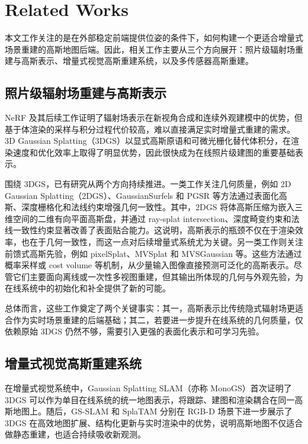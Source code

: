 
\section{Related Works}

本文工作关注的是在外部稳定前端提供位姿的条件下，如何构建一个更适合增量式场景重建的高斯地图后端。因此，相关工作主要从三个方向展开：照片级辐射场重建与高斯表示、增量式视觉高斯重建系统，以及多传感器高斯重建。

\subsection{照片级辐射场重建与高斯表示}

NeRF 及其后续工作证明了辐射场表示在新视角合成和连续外观建模中的优势，但基于体渲染的采样与积分过程代价较高，难以直接满足实时增量式重建的需求。3D Gaussian Splatting（3DGS）以显式高斯原语和可微光栅化替代体积分，在渲染速度和优化效率上取得了明显优势，因此很快成为在线照片级建图的重要基础表示。

围绕 3DGS，已有研究从两个方向持续推进。一类工作关注几何质量，例如 2D Gaussian Splatting（2DGS）、GaussianSurfels 和 PGSR 等方法通过表面化高斯、深度栅格化和法线约束增强几何一致性。其中，2DGS 将体高斯压缩为嵌入三维空间的二维有向平面高斯盘，并通过 ray-splat intersection、深度畸变约束和法线一致性约束显著改善了表面贴合能力。这说明，高斯表示的瓶颈不仅在于渲染效率，也在于几何一致性，而这一点对后续增量式系统尤为关键。另一类工作则关注前馈式高斯先验，例如 pixelSplat、MVSplat 和 MVSGaussian 等。这些方法通过概率采样或 cost volume 等机制，从少量输入图像直接预测可泛化的高斯表示。尽管它们主要面向离线或一次性多视图重建，但其输出所体现的几何与外观先验，为在线系统中的初始化和补全提供了新的可能。

总体而言，这些工作奠定了两个关键事实：其一，高斯表示比传统隐式辐射场更适合作为实时场景重建的后端基础；其二，若要进一步提升在线系统的几何质量，仅依赖原始 3DGS 仍然不够，需要引入更强的表面化表示和可学习先验。

\subsection{增量式视觉高斯重建系统}

在增量式视觉系统中，Gaussian Splatting SLAM（亦称 MonoGS）首次证明了 3DGS 可以作为单目在线系统的统一地图表示，将跟踪、建图和渲染耦合在同一高斯地图上。随后，GS-SLAM 和 SplaTAM 分别在 RGB-D 场景下进一步展示了 3DGS 在高效地图扩展、结构化更新与实时渲染中的优势，说明高斯地图不仅适合做静态重建，也适合持续吸收新观测。

